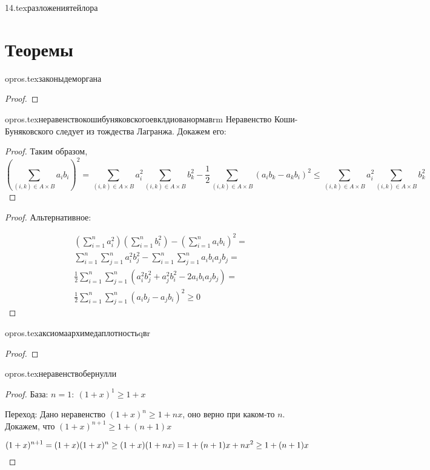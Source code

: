 {14.tex}{разложениятейлора}

\section{Теоремы}

{opros.tex}{законыдеморгана}
\begin{proof}
\end{proof}

{opros.tex}{неравенствокошибуняковскогоевклдиованормавrm}
Неравенство Коши-Буняковского следует из тождества Лагранжа. Докажем его:
\begin{proof}
    Таким образом, $$\left(\sum\limits_{(i,k)\in A\times B}a_ib_i\right)^2=\sum\limits_{(i,k)\in A\times B}a_i^2\sum\limits_{(i,k)\in A\times B}b_k^2 - \frac{1}{2}\sum\limits_{(i,k)\in A\times B}(a_ib_k-a_kb_i)^2 \leq \sum\limits_{(i,k)\in A\times B}a_i^2\sum\limits_{(i,k)\in A\times B}b_k^2$$
\end{proof}
\begin{proof}
    Альтернативное:

    \begin{align*}
        &\left(\sum_{i=1}^{n}a_i^2\right)\left(\sum_{i=1}^{n}b_i^2\right)-\left(\sum_{i=1}^{n}a_ib_i\right)^2=\\
        &\sum_{i=1}^{n}\sum_{j=1}^{n}a_i^2b_j^2-\sum_{i=1}^{n}\sum_{j=1}^{n}a_ib_ia_jb_j=\\
        &\frac12\sum_{i=1}^{n}\sum_{j=1}^{n}\left(a_i^2b_j^2+a_j^2b_i^2-2a_ib_ia_jb_j\right)=\\
        &\frac12\sum_{i=1}^{n}\sum_{j=1}^{n}(a_ib_j-a_jb_i)^2\geq0
    \end{align*}
\end{proof}

{opros.tex}{аксиомаархимедаплотностьqвr}
\begin{proof}
\end{proof}

{opros.tex}{неравенствобернулли}
\begin{proof}
    База: $n=1: \ (1+x)^1\geq 1 + x$

    Переход: Дано неравенство $(1+x)^n\geq 1+nx$, оно верно при каком-то $n$. Докажем, что $(1+x)^{n+1}\geq 1 + (n+1)x$

    $$(1+x)^{n+1} = (1+x)(1+x)^n\geq (1+x)(1+nx) = \\ 1 + (n+1)x + nx^2 \geq 1 + (n+1)x$$
\end{proof}

